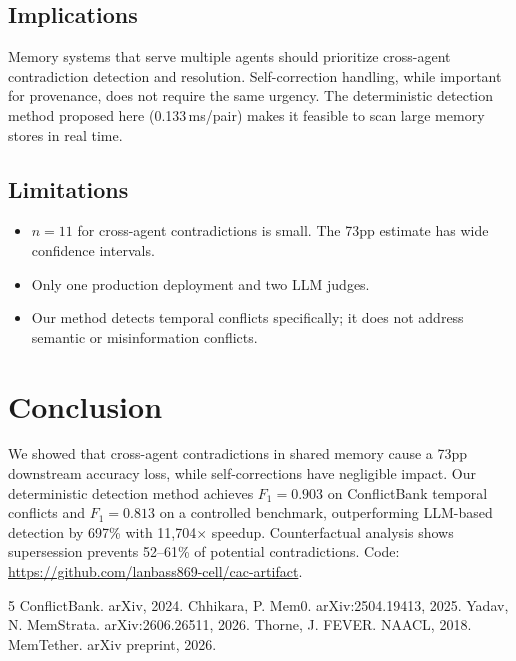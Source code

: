 \documentclass{article}
\begin{document}
\subsection{Implications}
Memory systems that serve multiple agents should prioritize cross-agent contradiction detection and resolution. Self-correction handling, while important for provenance, does not require the same urgency. The deterministic detection method proposed here (0.133\,ms/pair) makes it feasible to scan large memory stores in real time.

\subsection{Limitations}
\begin{itemize}
\item $n{=}11$ for cross-agent contradictions is small. The 73pp estimate has wide confidence intervals.
\item Only one production deployment and two LLM judges.
\item Our method detects temporal conflicts specifically; it does not address semantic or misinformation conflicts.
\end{itemize}

\section{Conclusion}

We showed that cross-agent contradictions in shared memory cause a 73pp downstream accuracy loss, while self-corrections have negligible impact. Our deterministic detection method achieves $F_1 = 0.903$ on ConflictBank temporal conflicts and $F_1 = 0.813$ on a controlled benchmark, outperforming LLM-based detection by 697\% with 11{,}704$\times$ speedup. Counterfactual analysis shows supersession prevents 52--61\% of potential contradictions. Code: \url{https://github.com/lanbass869-cell/cac-artifact}.

\begin{thebibliography}{5}
 ConflictBank. arXiv, 2024.
 Chhikara, P. Mem0. arXiv:2504.19413, 2025.
 Yadav, N. MemStrata. arXiv:2606.26511, 2026.
 Thorne, J. FEVER. NAACL, 2018.
 MemTether. arXiv preprint, 2026.
\end{thebibliography}
\end{document}
